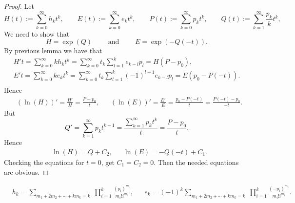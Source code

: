 \documentclass[12pt,a4paper]{article}
\begin{document}
    \begin{proof}
        Let
        \[
            H(t) := \sum_{k=0}^{\infty} h_k t^k,
            \qquad
            E(t) := \sum_{k=0}^{\infty} e_k t^k,
            \qquad
            P(t) := \sum_{k=0}^{\infty} p_k t^k,
            \qquad
            Q(t) := \sum_{k=1}^{\infty} \frac{p_k}{k} t^k,
            \qquad
        \]
        We need to show that
        \[
            H = \exp(Q)
            \qquad \text{ and } \qquad
            E = \exp(-Q(-t)).
        \]
        By previous lemma we have that
        \begin{gather*}
            H't
            = \sum_{k=0}^{\infty} k h_k t^k
            = \sum_{k=0}^{\infty} t_k \sum_{l=1}^k e_{k-l} p_l
            = H (P - p_0),\\
            E't
            = \sum_{k=0}^{\infty} k e_k t^k
            = \sum_{k=0}^{\infty} t_k \sum_{l=1}^k (-1)^{l+1} e_{k-l} p_l
            = E (p_0 - P(-t)).\\
        \end{gather*}
        Hence
        \begin{align*}
            &(\ln(H))' = \frac{H'}{H} = \frac{P - p_0}{t},&
            &(\ln(E))' = \frac{E'}{E} = \frac{p_0 - P(-t)}{t} = \frac{P(-t) - p_0}{-t}.
        \end{align*}
        But
        \[
            Q'
            = \sum_{k=1}^{\infty} p_k t^{k-1}
            = \frac{\sum_{k=1}^{\infty} p_k t^k}{t}
            = \frac{P - p_0}{t}.
        \]
        Hence
        \begin{align*}
            &\ln(H) = Q + C_2,&
            &\ln(E) = -Q(-t) + C_1.
        \end{align*}
        Checking the equations for $t = 0$, get $C_1 = C_2 = 0$. Then the needed equations are obvious.
    \end{proof}

    \begin{corollary} \label{e&h}
        \begin{align*}
            &h_k = \sum_{m_1 + 2 m_2 + \cdots + k m_k = k} \; \prod_{i=1}^k \frac{(p_i)^{m_i}}{m_i! i^{m_i}},&
            &e_k = (-1)^k \sum_{m_1 + 2 m_2 + \cdots + k m_k = k} \; \prod_{i=1}^k \frac{(-p_i)^{m_i}}{m_i! i^{m_i}}.
        \end{align*}
    \end{corollary}

    \breaker
\end{document}
